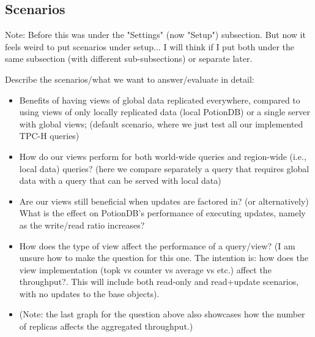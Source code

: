 \documentclass[sigplan,10pt]{acmart}
\begin{document}
\subsection{Scenarios}

Note: Before this was under the "Settings" (now "Setup") subsection.
But now it feels weird to put scenarios under setup... I will think if I put both under the same subsection (with different sub-subsections) or separate later.

Describe the scenarios/what we want to answer/evaluate in detail:
\begin{itemize}
	\item Benefits of having views of global data replicated everywhere, compared to using views of only locally replicated data (local PotionDB) or a single server with global views; (default scenario, where we just test all our implemented TPC-H queries)
	\item How do our views perform for both world-wide queries and region-wide (i.e., local data) queries? (here we compare separately a query that requires global data with a query that can be served with local data)
	\item Are our views still beneficial when updates are factored in? (or alternatively) What is the effect on PotionDB's performance of executing updates, namely as the write/read ratio increases?
	\item How does the type of view affect the performance of a query/view? (I am unsure how to make the question for this one. The intention is: how does the view implementation (topk vs counter vs average vs etc.) affect the throughput?. This will include both read-only and read+update scenarios, with no updates to the base objects).
	\item (Note: the last graph for the question above also showcases how the number of replicas affects the aggregated throughput.)
\end{itemize}
\end{document}
